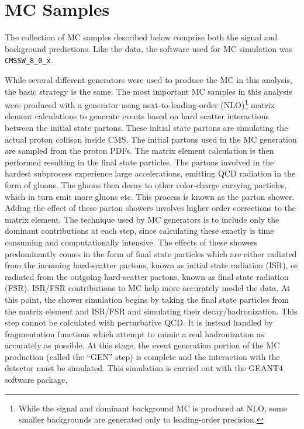 \section{MC Samples}
The collection of MC samples described below comprise both the signal and background predictions. 
Like the data, the software used for MC simulation was \texttt{CMSSW\_8\_0\_x}.

While several different generators were used to produce the MC in this analysis, the basic strategy is the same.
The most important MC samples in this analysis were produced with a generator using next-to-leading-order (NLO)\footnote{While the signal and dominant background MC is produced
at NLO, some smaller backgrounds are generated only to leading-order precision.}
matrix element calculations to generate events based on hard scatter
interactions between the initial state partons. These initial state partons are simulating the
actual proton collison inside CMS. The initial partons used in the MC generation are sampled from the proton PDFs.
The matrix element calculation is then performed resulting in the final state particles.
The partons involved in the hardest subprocess experience large accelerations, emitting QCD radiation in the form of gluons. The gluons then decay to other
color-charge carrying particles, which in turn emit more gluons etc. This process is known as the parton shower. Adding the effect of these parton showers involves
higher order corrections to the matrix element. The technique used by MC generators is to include only the dominant contributions at each step,
since calculating these exactly is time consuming and computationally intensive. The effects of these showers predominantly comes in the form of
final state particles which are either radiated from the incoming hard-scatter partons, known as initial state radiation (ISR), or radiated from
the outgoing hard-scatter partons, known as final state radiation (FSR). ISR/FSR contributions to MC help more accurately model the data.
At this point, the shower simulation begins by taking the final state particles from the matrix element and ISR/FSR and simulating their decay/hadronization. This step
cannot be calculated with perturbative QCD. It is instead handled by fragmentation functions which attempt to mimic a real
hadronization as accurately as possible. At this stage, the event generation portion of the MC production (called the ``GEN'' step)
is complete and the interaction with the detector must be simulated. This simulation is carried out with the GEANT4 software package,
